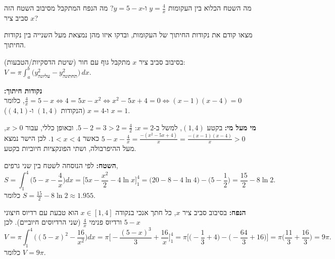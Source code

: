 
\begin{question}
מה השטח הכלוא בין העקומות $y=\frac{4}{x}$ ו-$y=5-x$?
מה הנפח המתקבל מסיבוב השטח הזה סביב ציר $x$?
\end{question}

\begin{hint}
מצאו קודם את נקודות החיתוך של העקומות, ובדקו איזו מהן נמצאת מעל השנייה בין נקודות החיתוך.
\end{hint}

\begin{hint}
בסיבוב סביב ציר $x$ מתקבל גוף עם חור (שיטת הדסקיות/הטבעות): $V=\pi\int_a^b\big(y_{\text{עליונה}}^2-y_{\text{תחתונה}}^2\big)\,dx$.
\end{hint}

\begin{solution}
\textbf{נקודות חיתוך:} $\frac4x=5-x \iff 4=5x-x^2 \iff x^2-5x+4=0 \iff (x-1)(x-4)=0$, כלומר $x=1$ ו-$x=4$ (הנקודות $(1,4)$ ו-$(4,1)$).

\textbf{מי מעל מי:} בקטע $(1,4)$, למשל ב-$x=2$: $5-2=3>2=\frac42$. ובאופן כללי, עבור $x>0$,
$5-x-\frac4x=\frac{-(x^2-5x+4)}{x}=\frac{-(x-1)(x-4)}{x}>0$ כאשר $1<x<4$. לכן הישר נמצא מעל ההיפרבולה, ושתי הפונקציות חיוביות בקטע.

\textbf{השטח:} לפי הנוסחה לשטח בין שני גרפים,
\[ S=\int_1^4\Big(5-x-\frac4x\Big)dx=\Big[5x-\frac{x^2}{2}-4\ln x\Big]_1^4
=\Big(20-8-4\ln4\Big)-\Big(5-\frac12\Big)=\frac{15}{2}-8\ln2 . \]
כלומר $\boxed{S=\frac{15}{2}-8\ln 2\approx 1.955}$.

\textbf{הנפח:} בסיבוב סביב ציר $x$, כל חתך אנכי בנקודה $x\in[1,4]$ הוא טבעת עם רדיוס חיצוני $5-x$ ורדיוס פנימי $\frac4x$ (שני הרדיוסים חיוביים). לכן
\[ V=\pi\int_1^4\Big((5-x)^2-\frac{16}{x^2}\Big)dx=\pi\Big[-\frac{(5-x)^3}{3}+\frac{16}{x}\Big]_1^4
=\pi\Big[\Big(-\frac13+4\Big)-\Big(-\frac{64}{3}+16\Big)\Big]=\pi\Big(\frac{11}{3}+\frac{16}{3}\Big)=9\pi . \]
כלומר $\boxed{V=9\pi}$.
\end{solution}
